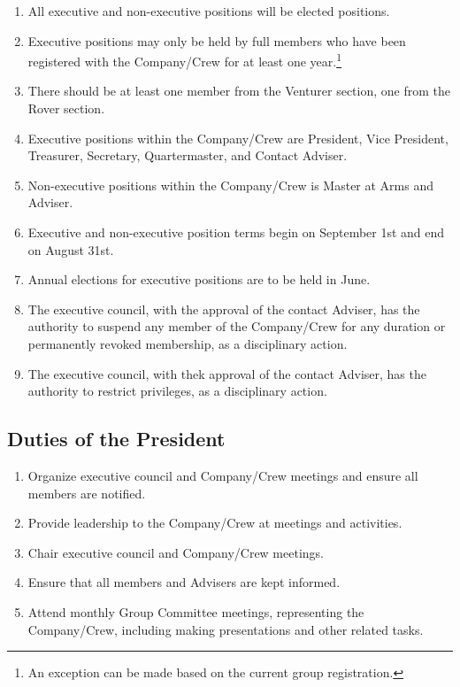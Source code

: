 \begin{enumerate}
    \item All executive and non-executive positions will be elected positions.
    \item Executive positions may only be held by full members who have been registered with the Company/Crew for at least one year.\footnote{An exception can be made based on the current group registration.}
    \item There should be at least one member from the Venturer section, one from the Rover section. \footnotemark[\value{footnote}]
    \item Executive positions within the Company/Crew are President, Vice President, Treasurer, Secretary, Quartermaster, and Contact Adviser.
    \item Non-executive positions within the Company/Crew is Master at Arms and Adviser.
    \item Executive and non-executive position terms begin on September 1st and end on August 31st.
    \item Annual elections for executive positions are to be held in June.
    \item The executive council, with the approval of the contact Adviser, has the authority to suspend any member of the Company/Crew for any duration or permanently revoked membership, as a disciplinary action.
    \item The executive council, with thek approval of the contact Adviser, has the authority to restrict privileges, as a disciplinary action.
\end{enumerate}

\subsection{Duties of the President}
\begin{enumerate}
    \item Organize executive council and Company/Crew meetings and ensure all members are notified.
    \item Provide leadership to the Company/Crew at meetings and activities.
    \item Chair executive council and Company/Crew meetings.
    \item Ensure that all members and Advisers are kept informed.
    \item Attend monthly Group Committee meetings, representing the Company/Crew, including making presentations and other related tasks.
\end{enumerate}


